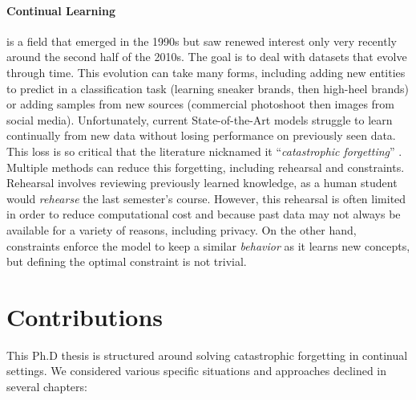 \paragraph{Continual Learning} is a field that emerged in the 1990s but saw renewed interest only
very recently around the second half of the 2010s. The goal is to deal with datasets that evolve
through time. This evolution can take many forms, including adding new entities to predict in a
classification task (\eg learning sneaker brands, then high-heel brands) or adding samples from new
sources (\eg commercial photoshoot then images from social media). Unfortunately, current
State-of-the-Art models struggle to learn continually from new data without losing performance on
previously seen data. This loss is so critical that the literature nicknamed it ``\textit{catastrophic
      forgetting}'' \citep{robins1995catastrophicforgetting,french1999catastrophicforgetting}. Multiple
methods can reduce this forgetting, including rehearsal and constraints. Rehearsal involves
reviewing previously learned knowledge, as a human student would \textit{rehearse} the last
semester's course. However, this rehearsal is often limited in order to reduce computational cost
and because past data may not always be available for a variety of reasons, including privacy. On
the other hand, constraints enforce the model to keep a similar \textit{behavior} as it learns new
concepts, but defining the optimal constraint is not trivial.

\section{Contributions}

This Ph.D thesis is structured around solving catastrophic forgetting in continual settings. We
considered various specific situations and approaches declined in several chapters:

